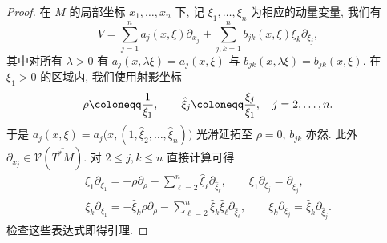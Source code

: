 \begin{proof}
在 $M$ 的局部坐标 $x_1, \ldots, x_n$ 下, 记 $\xi_1, \ldots, \xi_n$ 为相应的动量变量, 我们有
\begin{equation}\label{eq:10.7}
    V = \sum_{j=1}^{n} a_j(x, \xi) \partial_{x_j} + \sum_{j, k=1}^{n} b_{jk}(x, \xi) \xi_k \partial_{\xi_j},
\end{equation}
其中对所有 $\lambda > 0$ 有 $a_j(x, \lambda \xi) = a_j(x, \xi)$ 与 $b_{jk}(x, \lambda \xi) = b_{jk}(x, \xi)$. 在 $\xi_1 > 0$ 的区域内, 我们使用射影坐标
\begin{equation}\label{eq:10.8}
    \rho \defeq \frac{1}{\xi_1}, \qquad \hat{\xi}_j \defeq \frac{\xi_j}{\xi_1}, \quad j = 2, \ldots, n.
\end{equation}
于是 $a_j(x, \xi) = a_j\bigl(x, (1, \hat{\xi}_2, \ldots, \hat{\xi}_n)\bigr)$ 光滑延拓至 $\rho = 0$, $b_{jk}$ 亦然. 此外 $\partial_{x_j} \in \mathcal{V}(\overline{T^* M})$. 对 $2 \le j, k \le n$ 直接计算可得
\begin{equation}\label{eq:10.9}
    \begin{gathered}
        \xi_1 \partial_{\xi_1} = -\rho \partial_\rho - \sum_{\ell=2}^{n} \hat{\xi}_\ell \partial_{\hat{\xi}_\ell}, \qquad
        \xi_1 \partial_{\xi_j} = \partial_{\hat{\xi}_j}, \\
        \xi_k \partial_{\xi_1} = -\hat{\xi}_k \rho \partial_\rho - \sum_{\ell=2}^{n} \hat{\xi}_k \hat{\xi}_\ell \partial_{\hat{\xi}_\ell}, \qquad
        \xi_k \partial_{\xi_j} = \hat{\xi}_k \partial_{\hat{\xi}_j}.
    \end{gathered}
\end{equation}
检查这些表达式即得引理.
\end{proof}

